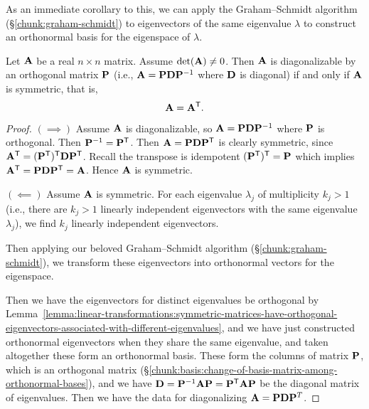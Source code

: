 \begin{remark}
As an immediate corollary to this, we can apply the Graham--Schmidt
algorithm (\S\ref{chunk:graham-schmidt}) to eigenvectors of the same
eigenvalue $\lambda$ to construct an orthonormal basis for the
eigenspace of $\lambda$.
\end{remark}

\begin{theorem}\label{thm:spectral-theorem}
  Let $\mathbf{A}$ be a real $n\times n$ matrix. Assume $\det(\mathbf{A})\neq0$.
  Then $\mathbf{A}$ is diagonalizable by an orthogonal matrix $\mathbf{P}$
  (i.e., $\mathbf{A}=\mathbf{P}\mathbf{D}\mathbf{P}^{-1}$ where $\mathbf{D}$ is diagonal) if and only if
  $\mathbf{A}$ is symmetric, that is,
\begin{equation}
\mathbf{A} = \mathbf{A}^{\mathsf{T}}.
\end{equation}
\end{theorem}

\begin{proof}
$(\implies)$ Assume $\mathbf{A}$ is diagonalizable, so $\mathbf{A}=\mathbf{P}\mathbf{D}\mathbf{P}^{-1}$
  where $\mathbf{P}$ is orthogonal. Then $\mathbf{P}^{-1} = \mathbf{P}^{\mathsf{T}}$.
  Then $\mathbf{A} = \mathbf{P}\mathbf{D}\mathbf{P}^{\mathsf{T}}$ is clearly
  symmetric, since $\mathbf{A}^{\mathsf{T}}=(\mathbf{P}^{\mathsf{T}})^{\mathsf{T}}\mathbf{D}\mathbf{P}^{\mathsf{T}}$.
  Recall the transpose is idempotent $(\mathbf{P}^{\mathsf{T}})^{\mathsf{T}}=\mathbf{P}$
  which implies $\mathbf{A}^{\mathsf{T}}=\mathbf{P}\mathbf{D}\mathbf{P}^{\mathsf{T}}=\mathbf{A}$.
  Hence $\mathbf{A}$ is symmetric.

  \medbreak
  $(\impliedby)$ Assume $\mathbf{A}$ is symmetric.
For each eigenvalue $\lambda_{j}$ of multiplicity $k_{j}>1$ (i.e., there
are $k_{j}>1$ linearly independent eigenvectors with the same eigenvalue
$\lambda_{j}$), we find $k_{j}$ linearly independent eigenvectors.

Then applying our beloved Graham--Schmidt algorithm
(\S\ref{chunk:graham-schmidt}), we transform these eigenvectors into
orthonormal vectors for the eigenspace.


Then we have the eigenvectors for distinct eigenvalues be orthogonal by Lemma~\ref{lemma:linear-transformations:symmetric-matrices-have-orthogonal-eigenvectors-associated-with-different-eigenvalues},
and we have just constructed orthonormal eigenvectors when they share
the same eigenvalue, and taken altogether these form an orthonormal
basis. These
form the columns of matrix $\mathbf{P}$, which is an orthogonal matrix (\S\ref{chunk:basis:change-of-basis-matrix-among-orthonormal-bases}), and
we have $\mathbf{D}=\mathbf{P}^{-1}\mathbf{A}\mathbf{P}=\mathbf{P}^{\mathsf{T}}\mathbf{A}\mathbf{P}$
be the diagonal matrix of eigenvalues. Then we have the data for
diagonalizing $\mathbf{A}=\mathbf{P}\mathbf{D}\mathbf{P}^{T}$.
\end{proof}

